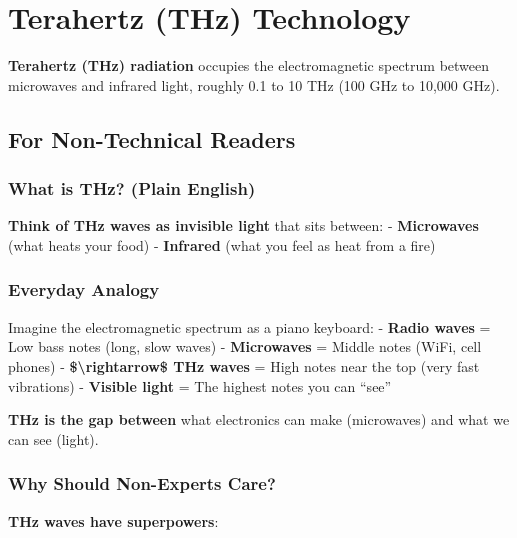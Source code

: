 \section{Terahertz (THz) Technology}\label{terahertz-thz-technology}

\textbf{Terahertz (THz) radiation} occupies the electromagnetic spectrum
between microwaves and infrared light, roughly 0.1 to 10 THz (100 GHz to
10,000 GHz).

\subsection{\texorpdfstring{ For Non-Technical
Readers}{ For Non-Technical Readers}}\label{for-non-technical-readers}

\subsubsection{What is THz? (Plain
English)}\label{what-is-thz-plain-english}

\textbf{Think of THz waves as invisible light} that sits between: -
\textbf{Microwaves} (what heats your food) - \textbf{Infrared} (what you
feel as heat from a fire)

\subsubsection{Everyday Analogy}\label{everyday-analogy}

Imagine the electromagnetic spectrum as a piano keyboard: -
\textbf{Radio waves} = Low bass notes (long, slow waves) -
\textbf{Microwaves} = Middle notes (WiFi, cell phones) -
\textbf{\$\textbackslash rightarrow\$ THz waves} = High notes near the
top (very fast vibrations) - \textbf{Visible light} = The highest notes
you can ``see''

\textbf{THz is the gap between} what electronics can make (microwaves)
and what we can see (light).

\subsubsection{Why Should Non-Experts
Care?}\label{why-should-non-experts-care}

\textbf{THz waves have superpowers}:

